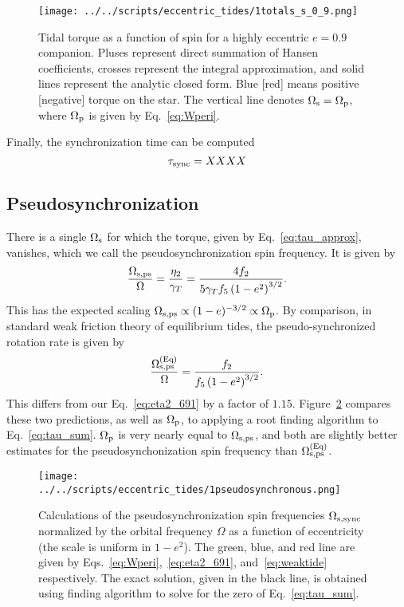 \documentclass[
        fleqn,
        usenatbib,
    ]{mnras}
\newcommand*{\p}[1]{\left(#1\right)}
\begin{document}
\begin{figure}
    \centering
    \texttt{[image: ../../scripts/eccentric\_tides/1totals\_s\_0\_9.png]}
    \caption{Tidal torque as a function of spin for a highly eccentric $e = 0.9$
    companion. Pluses represent direct summation of Hansen coefficients, crosses
    represent the integral approximation, and solid lines represent the
    analytic closed form. Blue [red] means positive [negative]
    torque on the star. The vertical line denotes $\Omega_{\rm s} = \Omega_{\rm
    p}$, where $\Omega_{\rm p}$ is given by Eq.~\eqref{eq:Wperi}. }\label{fig:totals_s}
\end{figure}

\textcolor{Corr}{Finally, the synchronization time can be computed}
\begin{equation}
    \tau_{\rm sync} = XXXX
\end{equation}

\subsection{Pseudosynchronization}

There is a single $\Omega_{\rm s}$ for which the torque, given by
Eq.~\eqref{eq:tau_approx}, vanishes, which we call the pseudosynchronization
spin frequency. It is given by
\begin{equation}
    \frac{\Omega_{\rm s, ps}}{\Omega} =
        \frac{\eta_2}{\gamma_T} = \frac{4f_2}{5\gamma_T f_5\p{1 -
        e^2}^{3/2}}.\label{eq:eta2_691}
\end{equation}
This has the expected scaling $\Omega_{\rm s, ps} \propto (1 - e)^{-3/2} \propto
\Omega_{\rm p}$. By comparison, in standard weak friction theory of equilibrium
tides, the pseudo-synchronized rotation rate is given by
\citep{alexander73, hut81}
\begin{equation}
    \frac{\Omega_{\rm s, ps}^{\rm (Eq)}}{\Omega} = \frac{f_2}{f_5\p{1 -
        e^2}^{3/2}}.\label{eq:weaktide}
\end{equation}
This differs from our Eq.~\eqref{eq:eta2_691} by a factor of $1.15$.
Figure~\ref{fig:pseudosync} compares these two predictions, as well as
$\Omega_{\rm p}$, to applying a root finding algorithm to
Eq.~\eqref{eq:tau_sum}. $\Omega_{\rm p}$ is very nearly equal to $\Omega_{\rm s,
ps}$, and both are slightly better estimates for the pseudosynchonization spin
frequency than $\Omega_{\rm s, ps}^{\rm (Eq)}$.
\begin{figure}
    \centering
    \texttt{[image: ../../scripts/eccentric\_tides/1pseudosynchronous.png]}
    \caption{Calculations of the pseudosynchronization spin frequencies
    $\Omega_{\rm s, sync}$ normalized by the orbital frequency $\Omega$ as a
    function of eccentricity (the scale is uniform in $1 - e^2$). The green,
    blue, and red line are given by Eqs.~\eqref{eq:Wperi},~\eqref{eq:eta2_691},
    and~\eqref{eq:weaktide} respectively. The exact solution, given in the black
    line, is obtained using finding algorithm to solve for the zero of
    Eq.~\eqref{eq:tau_sum}.}\label{fig:pseudosync}
\end{figure}
\end{document}
